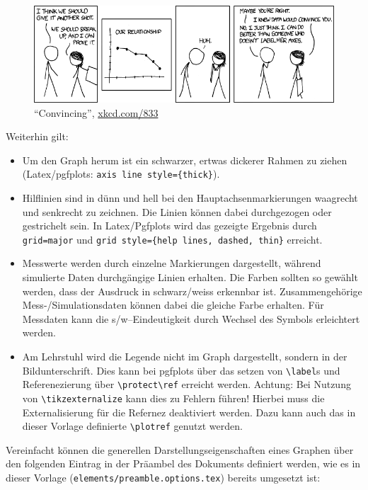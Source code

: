 \begin{figure}[H]%
    \centering

    \includegraphics[width=0.8\columnwidth]{images/examples/axes-xkcd}%
    \caption{"`Convincing"', \href{http://xkcd.com/833/}{xkcd.com/833}}%
    \label{fig:label-your-axes-xkcd}%
\end{figure}

Weiterhin gilt:

\begin{itemize}
	\item Um den Graph herum ist ein schwarzer, ertwas dickerer Rahmen zu ziehen (Latex/pgfplots: \verb+axis line style={thick}+).
    \item Hilflinien sind in dünn und hell bei den Hauptachsenmarkierungen waagrecht und senkrecht zu zeichnen. Die Linien können dabei durchgezogen oder gestrichelt sein. In Latex/Pgfplots wird das gezeigte Ergebnis durch \verb+grid=major+ und \verb+grid style={help lines, dashed, thin}+ erreicht.
    \item Messwerte werden durch einzelne Markierungen dargestellt, während simulierte Daten durchgängige Linien erhalten. Die Farben sollten so gewählt werden, dass der Ausdruck in schwarz/weiss erkennbar ist. Zusammengehörige Mess-/Simulationsdaten können dabei die gleiche Farbe erhalten. Für Messdaten kann die s/w--Eindeutigkeit durch Wechsel des Symbols erleichtert werden.
    \item Am Lehrstuhl wird die Legende nicht im Graph dargestellt, sondern in der Bildunterschrift. Dies kann bei pgfplots über das setzen von \verb+\label+s und Referenezierung über \verb+\protect\ref+ erreicht werden. \textcolor[rgb]{0.55,0,0}{Achtung}: Bei Nutzung von \verb+\tikzexternalize+ kann dies zu Fehlern führen! Hierbei muss die Externalisierung für die Refernez deaktiviert werden. Dazu kann auch das in dieser Vorlage definierte \verb+\plotref+ genutzt werden.
\end{itemize}

Vereinfacht können die generellen Darstellungseigenschaften eines Graphen über den folgenden Eintrag in der Präambel des Dokuments definiert werden, wie es in dieser Vorlage (\verb+elements/preamble.options.tex+) bereits umgesetzt ist:

